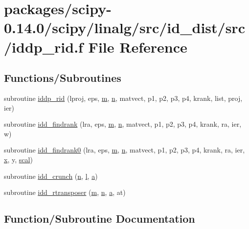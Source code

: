 \hypertarget{iddp__rid_8f}{}\section{packages/scipy-\/0.14.0/scipy/linalg/src/id\+\_\+dist/src/iddp\+\_\+rid.f File Reference}
\label{iddp__rid_8f}
\subsection*{Functions/\+Subroutines}
\begin{DoxyCompactItemize}
\item 
subroutine \hyperlink{iddp__rid_8f_ab103502c907f1cbfbba2dc72923992ec}{iddp\+\_\+rid} (lproj, eps, \hyperlink{indexexpr_8h_ab72fdb4031d47b75ab26dd18a437bcdc}{m}, \hyperlink{indexexpr_8h_ab427e2e2b4d6cec55fa088ea2a692ace}{n}, matvect, p1, p2, p3, p4, krank, list, proj, ier)
\item 
subroutine \hyperlink{iddp__rid_8f_a671665171573d1356668ce16b0b4a494}{idd\+\_\+findrank} (lra, eps, \hyperlink{indexexpr_8h_ab72fdb4031d47b75ab26dd18a437bcdc}{m}, \hyperlink{indexexpr_8h_ab427e2e2b4d6cec55fa088ea2a692ace}{n}, matvect, p1, p2, p3, p4, krank, ra, ier, w)
\item 
subroutine \hyperlink{iddp__rid_8f_afdd57ff7eaf13c0298762f01ff078ba4}{idd\+\_\+findrank0} (lra, eps, \hyperlink{indexexpr_8h_ab72fdb4031d47b75ab26dd18a437bcdc}{m}, \hyperlink{indexexpr_8h_ab427e2e2b4d6cec55fa088ea2a692ace}{n}, matvect, p1, p2, p3, p4, krank, ra, ier, \hyperlink{vecnorm1_8cc_ac73eed9e41ec09d58f112f06c2d6cb63}{x}, y, \hyperlink{dense_8h_a0440a74729365d9e7ed71b8f3927a27f}{scal})
\item 
subroutine \hyperlink{iddp__rid_8f_a1c76bb0e06bd861f8f55102dc553c790}{idd\+\_\+crunch} (\hyperlink{indexexpr_8h_ab427e2e2b4d6cec55fa088ea2a692ace}{n}, \hyperlink{indexexpr_8h_a88aacdaa46b76729743ee33ef8b95a58}{l}, \hyperlink{gen__mat5files_8m_aae328bf20413f220e38aec4d95bfd6da}{a})
\item 
subroutine \hyperlink{iddp__rid_8f_acbd705089e7e11fa50bbe2f3d45e799a}{idd\+\_\+rtransposer} (\hyperlink{indexexpr_8h_ab72fdb4031d47b75ab26dd18a437bcdc}{m}, \hyperlink{indexexpr_8h_ab427e2e2b4d6cec55fa088ea2a692ace}{n}, \hyperlink{gen__mat5files_8m_aae328bf20413f220e38aec4d95bfd6da}{a}, at)
\end{DoxyCompactItemize}


\subsection{Function/\+Subroutine Documentation}
\hypertarget{iddp__rid_8f_a1c76bb0e06bd861f8f55102dc553c790}{}
